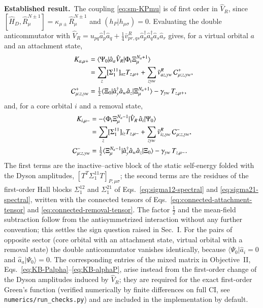 \documentclass[aip,jcp,reprint,noshowkeys,superscriptaddress]{revtex4-1}
\newcommand{\Established}{\textbf{Established result.}\ }
\begin{document}
\Established The coupling \eqref{eq:sm-KPmu} is of first order in
$\hat V_R$, since $[\hat H_D,\hat R^{N\pm1}_\mu]=\kappa_{\mu\pm}\hat R^{N\pm1}_\mu$
and $(h_P|h_{\mu\sigma})=0$.  Evaluating the double anticommutator with
$\hat V_R=u_{pq}\hat a_p^\dagger\hat a_q+\tfrac14\bar v^R_{pr,qs}\hat a_p^\dagger\hat a_q^\dagger\hat a_s\hat a_r$
gives, for a virtual orbital $a$ and an attachment state,
\begin{align}
  K_{a,\mu+}&=\langle\Psi_0|\hat a_a\hat V_R|\Phi_{\rm i}\Xi^{N_a+1}_\mu\rangle
  \nonumber\\
  &=\sum_z[\Sigma^{11}_1]_{az}T_{z,\mu+}
  +\sum_{zyw}\bar v^R_{az,yw}\,\mathcal C^{+}_{\mu;z,yw},
  \label{eq:sm-Ka}\\
  \mathcal C^{+}_{\mu;z,yw}&=\tfrac12\langle\Xi_0|\hat a_y^\dagger\hat a_w\hat a_z|\Xi^{N_a+1}_\mu\rangle
  -\gamma_{yw}\,T_{z,\mu+},
  \label{eq:sm-Cplus}
\end{align}
and, for a core orbital $i$ and a removal state,
\begin{align}
  K_{i,\mu-}&=-\langle\Phi_{\rm i}\Xi^{N_a-1}_\mu|\hat V_R\,\hat a_i|\Psi_0\rangle
  \nonumber\\
  &=\sum_z[\Sigma^{11}_1]_{iz}T_{z,\mu-}
  +\sum_{zyw}\bar v^R_{iz,yw}\,\mathcal C^{-}_{\mu;z,yw},
  \label{eq:sm-Ki}\\
  \mathcal C^{-}_{\mu;z,yw}&=\tfrac12\langle\Xi^{N_a-1}_\mu|\hat a_y^\dagger\hat a_w\hat a_z|\Xi_0\rangle
  -\gamma_{yw}\,T_{z,\mu-} .
  \label{eq:sm-Cminus}
\end{align}
The first terms are the inactive--active block of the static self-energy
folded with the Dyson amplitudes, $[T^{T}\Sigma^{11}_1T]_{P,\mu\sigma}$; the
second terms are the residues of the first-order Hall blocks
$\Sigma^{12}_1$ and $\Sigma^{21}_1$ of Eqs.~\eqref{eq:sigma12-spectral} and
\eqref{eq:sigma21-spectral}, written with the connected tensors of
Eqs.~\eqref{eq:connected-attachment-tensor} and
\eqref{eq:connected-removal-tensor}.  The factor $\tfrac12$ and the
mean-field subtraction follow from the antisymmetrized interaction without
any further convention; this settles the sign question raised in Sec.~I.
For the pairs of opposite sector (core orbital with an attachment state,
virtual orbital with a removal state) the double anticommutator vanishes
identically, because $\langle\Psi_0|\hat a_i=0$ and $\hat a_a|\Psi_0\rangle=0$.
The corresponding entries of the mixed matrix in Objective~II,
Eqs.~\eqref{eq:KB-Palpha}--\eqref{eq:KB-alphaP}, arise instead from the
first-order change of the Dyson amplitudes induced by $\hat V_R$; they are
required for the exact first-order Green's function (verified numerically
by finite differences on full CI, see \texttt{numerics/run\_checks.py}) and
are included in the implementation by default.
\end{document}

